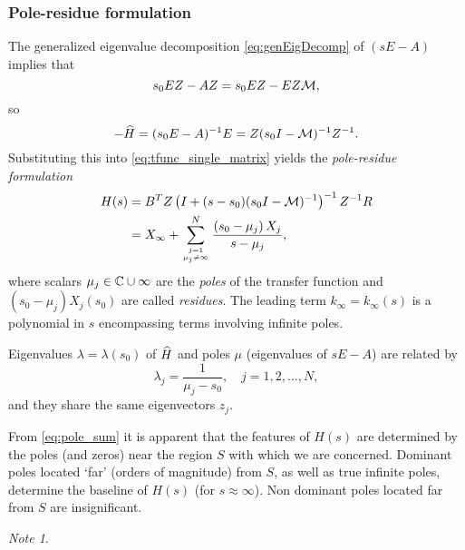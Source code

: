 \documentclass[letterpaper]{article}
\theoremstyle{remark}
\newtheorem*{note}{Note}
\begin{document}
\begin{description}
	\subsubsection{Pole-residue formulation}
	The generalized eigenvalue decomposition \eqref{eq:genEigDecomp} of $(sE-A)$ 
	implies that
	\[
		s_0EZ-AZ = s_0EZ-EZ\mathcal{M},
	\]
	so 
	\[
		 -\widehat{H} = (s_0E-A)^{-1}E = Z(s_0I-\mathcal{M})^{-1}Z^{-1}.
	\]
  Substituting this into \eqref{eq:tfunc_single_matrix} yields the 
  \emph{pole-residue formulation}
  \begin{align}
	  H(s) &= B^TZ\left(I+(s-s_0)(s_0I-\mathcal{M})^{-1}\right)^{-1}Z^{-1}R\nonumber\\
	  &= X_\infty +
	  \sum_{j=1\atop{\mu_j\neq\infty}}^N \frac{\left(s_0-\mu_j\right)X_j}{s-\mu_j},
  \label{eq:pole_sum}
  \end{align}
  where scalars $\mu_j\in\mathbb{C}\cup \infty$ are the \emph{poles} of the transfer 
  function and 
  $(s_0-\mu_j)X_j(s_0)$ are called \emph{residues}. The leading term
  $k_\infty=k_\infty(s)$ is a polynomial in $s$ encompassing terms 
  involving infinite poles.  
  
  Eigenvalues $\lambda=\lambda(s_0)$ of $\widehat{H}$ and poles $\mu$ 
  (eigenvalues of $sE-A$) are related by 
  \begin{equation}
  	  \lambda_j = \frac{1}{\mu_j-s_0}, \quad j=1,2,...,N,
    \label{eq:pole_eig}
  \end{equation}
   and they share the same eigenvectors $z_j$. 
   
    From \eqref{eq:pole_sum} it is apparent that the features of $H(s)$ are 
     determined by the poles (and zeros) near the region $S$ 
     with which we are concerned.  Dominant poles located `far' 
     (orders of magnitude) from $S$, as well as true infinite poles, determine
  the baseline of $H(s)$ (for $s\approx\infty$).  Non dominant poles located
  far from $S$ are insignificant.  
  
  \medskip
  
  
  \begin{note}
  \begin{comment}
   The presence of $s_0$ in 
  \eqref{eq:eig_sum} and \eqref{eq:pole_sum} may be misleading; the transfer 
  function $H(s)$ of the unreduced model does not depend on $s_0$, but 
  $X=X(s_0)$ does.  
  The matrix $Z$ from \eqref{eq:genEigDecomp} is equivalent to that from 
  \eqref{eq:eigDecomp} (up to a possible re-ordering of columns),
  so the matrices $X_j$ are the same as well.
  In fact, each eigenvalue $\lambda$ of the matrix $\A$ is uniquely associated
  with
  a pole $\mu$ of the transfer function via the relation
  \begin{equation}
	  \mu = s_0 + \frac{1}{\lambda},
  \label{eq:pole_eig}
  \end{equation}
 An important distinction to be made is that the set of poles $\mu_j$ 
 of the transfer function
 (eigenvalues of the matrix pencil $sE-A$) is a defining
 characteristic of the model, while
 eigenvalues $\lambda = \lambda(s_0)$ of $\A$ depend on the choice of $s_0$.
\end{comment}


\end{note}
\end{description}
\end{document}
